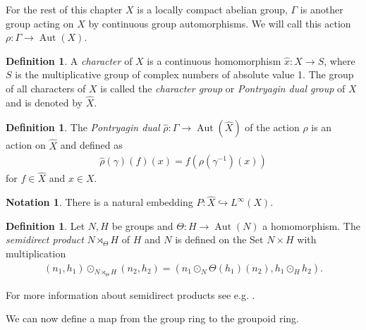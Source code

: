\documentclass[12pt,a4paper]{scrartcl}
\theoremstyle{plain}
\theoremstyle{definition}
\newtheorem{Definition}[Theorem]{Definition}
\newtheorem{Notation}[Theorem]{Notation}
\numberwithin{equation}{section}
\newcommand{\2}{\mathbb{Z} / 2 \mathbb{Z}}
\newcommand{\1}{\bar{1}}
\newcommand{\0}{\bar{0}}
\newcommand{\Aut}{\operatorname{Aut}}
\begin{document}
For the rest of this chapter $X$ is a locally compact abelian group, $\Gamma$ is another group acting on $X$ by continuous group automorphisms. We will call this action $\rho\colon\Gamma \to \Aut(X)$.
\begin{Definition}
	A \emph{character} of $X$ is a continuous homomorphism $\hat{x}\colon X \to S$, where $S$ is the multiplicative group of complex numbers of absolute value 1. The group of all characters of $X$ is called the \emph{character group} or \emph{Pontryagin dual group} of $X$ and is denoted by $\hat{X}$.
\end{Definition}
\begin{Definition}
	The \emph{Pontryagin dual} $\hat{\rho}\colon\Gamma \to \Aut(\hat{X})$ of the action $\rho$ is an action on $\hat{X}$ and defined as
	\begin{align*}
		\hat{\rho}(\gamma)(f)(x) = f(\rho(\gamma^{-1})(x))
	\end{align*}
	for $f \in \hat{X}$ and $x \in X$.
\end{Definition}
\begin{Notation}
	There is a natural embedding $P \colon \hat{X} \hookrightarrow L^{\infty}(X)$.
\end{Notation}
\begin{Definition}
	Let $N, H$ be groups and $\Theta \colon H \to \Aut(N)$ a homomorphism. The \emph{semidirect product} $N \rtimes_\Theta H$ of $H$ and $N$ is defined on the Set $N \times H$ with multiplication 
	\begin{align*}
		(n_1, h_1) \odot_{N \rtimes_\Theta H} (n_2, h_2) = (n_1 \odot_N \Theta(h_1)(n_2), h_1 \odot_H h_2).
	\end{align*}
\end{Definition}

For more information about semidirect products see e.g. \cite{ALG}.

We can now define a map from the group ring to the groupoid ring. 
\end{document}
